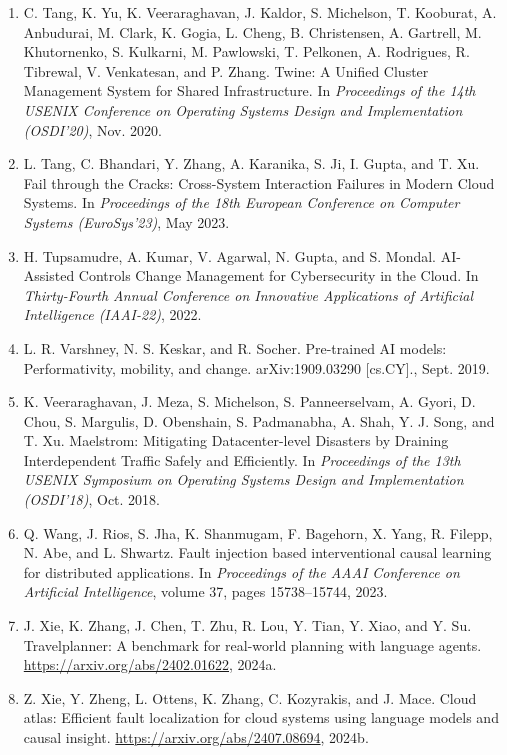 \begin{enumerate}[leftmargin=2em,itemsep=2pt]
\item C. Tang, K. Yu, K. Veeraraghavan, J. Kaldor, S. Michelson, T. Kooburat, A. Anbudurai, M. Clark, K. Gogia, L. Cheng, B. Christensen, A. Gartrell, M. Khutornenko, S. Kulkarni, M. Pawlowski, T. Pelkonen, A. Rodrigues, R. Tibrewal, V. Venkatesan, and P. Zhang. Twine: A Unified Cluster Management System for Shared Infrastructure. In \textit{Proceedings of the 14th USENIX Conference on Operating Systems Design and Implementation (OSDI'20)}, Nov. 2020.

\item L. Tang, C. Bhandari, Y. Zhang, A. Karanika, S. Ji, I. Gupta, and T. Xu. Fail through the Cracks: Cross-System Interaction Failures in Modern Cloud Systems. In \textit{Proceedings of the 18th European Conference on Computer Systems (EuroSys'23)}, May 2023.

\item H. Tupsamudre, A. Kumar, V. Agarwal, N. Gupta, and S. Mondal. AI-Assisted Controls Change Management for Cybersecurity in the Cloud. In \textit{Thirty-Fourth Annual Conference on Innovative Applications of Artificial Intelligence (IAAI-22)}, 2022.

\item L. R. Varshney, N. S. Keskar, and R. Socher. Pre-trained AI models: Performativity, mobility, and change. arXiv:1909.03290 [cs.CY]., Sept. 2019.

\item K. Veeraraghavan, J. Meza, S. Michelson, S. Panneerselvam, A. Gyori, D. Chou, S. Margulis, D. Obenshain, S. Padmanabha, A. Shah, Y. J. Song, and T. Xu. Maelstrom: Mitigating Datacenter-level Disasters by Draining Interdependent Traffic Safely and Efficiently. In \textit{Proceedings of the 13th USENIX Symposium on Operating Systems Design and Implementation (OSDI'18)}, Oct. 2018.

\item Q. Wang, J. Rios, S. Jha, K. Shanmugam, F. Bagehorn, X. Yang, R. Filepp, N. Abe, and L. Shwartz. Fault injection based interventional causal learning for distributed applications. In \textit{Proceedings of the AAAI Conference on Artificial Intelligence}, volume 37, pages 15738--15744, 2023.

\item J. Xie, K. Zhang, J. Chen, T. Zhu, R. Lou, Y. Tian, Y. Xiao, and Y. Su. Travelplanner: A benchmark for real-world planning with language agents. \url{https://arxiv.org/abs/2402.01622}, 2024a.

\item Z. Xie, Y. Zheng, L. Ottens, K. Zhang, C. Kozyrakis, and J. Mace. Cloud atlas: Efficient fault localization for cloud systems using language models and causal insight. \url{https://arxiv.org/abs/2407.08694}, 2024b.


\end{enumerate}
